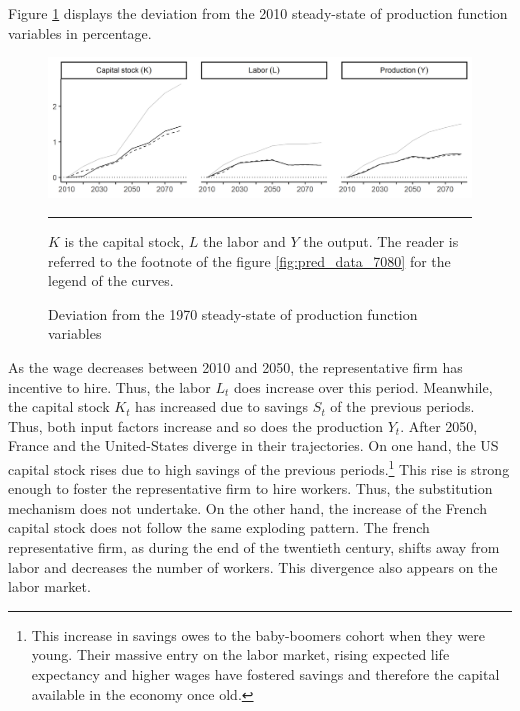 Figure \ref{fig:dev_prod_1080} displays the deviation from the 2010 steady-state of production function variables in percentage.
\begin{figure}[tb]
	\centering
	\includegraphics[width=1\linewidth]{../result/deviation/dev_prod1080.png}
	\caption{Deviation from the 1970 steady-state of production function variables}
	\label{fig:dev_prod_1080}
	\vspace{.5ex}
	\hrule
	\vspace{-4ex}
	\justify\singlespacing\footnotesize $K$ is the capital stock, $L$ the labor and $Y$ the output. The reader is referred to the footnote of the figure \ref{fig:pred_data_7080} for the legend of the curves.
\end{figure}
As the wage decreases between 2010 and 2050, the representative firm has incentive to hire. Thus, the labor $L_t$ does increase over this period. Meanwhile, the capital stock $K_t$ has increased due to savings $S_t$ of the previous periods. Thus, both input factors increase and so does the production $Y_t$. After 2050, France and the United-States diverge in their trajectories. On one hand, the US capital stock rises due to high savings of the previous periods.\footnote{This increase in savings owes to the baby-boomers cohort when they were young. Their massive entry on the labor market, rising expected life expectancy and higher wages have fostered savings and therefore the capital available in the economy once old.} This rise is strong enough to foster the representative firm to hire workers. Thus, the substitution mechanism does not undertake. On the other hand, the increase of the French capital stock does not follow the same exploding pattern. The french representative firm, as during the end of the twentieth century, shifts away from labor and decreases the number of workers. This divergence also appears on the labor market.

